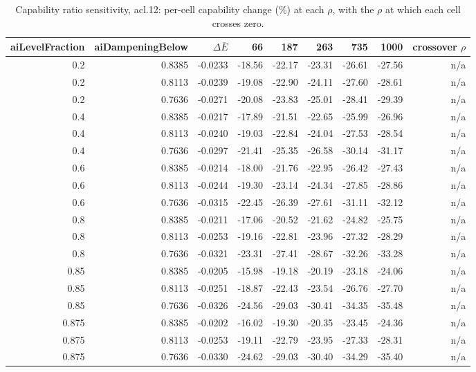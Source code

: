 \begin{table}[htbp]
  \centering
  \caption{Capability ratio sensitivity, acl.12: per-cell capability change (\%) at each $\rho$, with the $\rho$ at which each cell crosses zero.}
  \label{tab:rho-acl-12-cells}
  \begin{tabular}{r r r r r r r r r}
    \toprule
    aiLevelFraction & aiDampeningBelow & $\Delta\overline{E}$ & 66 & 187 & 263 & 735 & 1000 & crossover $\rho$ \\
    \midrule
    0.2 & 0.8385 & -0.0233 & -18.56 & -22.17 & -23.31 & -26.61 & -27.56 & n/a \\
    0.2 & 0.8113 & -0.0239 & -19.08 & -22.90 & -24.11 & -27.60 & -28.61 & n/a \\
    0.2 & 0.7636 & -0.0271 & -20.08 & -23.83 & -25.01 & -28.41 & -29.39 & n/a \\
    0.4 & 0.8385 & -0.0217 & -17.89 & -21.51 & -22.65 & -25.99 & -26.96 & n/a \\
    0.4 & 0.8113 & -0.0240 & -19.03 & -22.84 & -24.04 & -27.53 & -28.54 & n/a \\
    0.4 & 0.7636 & -0.0297 & -21.41 & -25.35 & -26.58 & -30.14 & -31.17 & n/a \\
    0.6 & 0.8385 & -0.0214 & -18.00 & -21.76 & -22.95 & -26.42 & -27.43 & n/a \\
    0.6 & 0.8113 & -0.0244 & -19.30 & -23.14 & -24.34 & -27.85 & -28.86 & n/a \\
    0.6 & 0.7636 & -0.0315 & -22.45 & -26.39 & -27.61 & -31.11 & -32.12 & n/a \\
    0.8 & 0.8385 & -0.0211 & -17.06 & -20.52 & -21.62 & -24.82 & -25.75 & n/a \\
    0.8 & 0.8113 & -0.0253 & -19.16 & -22.81 & -23.96 & -27.32 & -28.29 & n/a \\
    0.8 & 0.7636 & -0.0321 & -23.31 & -27.41 & -28.67 & -32.26 & -33.28 & n/a \\
    0.85 & 0.8385 & -0.0205 & -15.98 & -19.18 & -20.19 & -23.18 & -24.06 & n/a \\
    0.85 & 0.8113 & -0.0251 & -18.87 & -22.43 & -23.54 & -26.76 & -27.70 & n/a \\
    0.85 & 0.7636 & -0.0326 & -24.56 & -29.03 & -30.41 & -34.35 & -35.48 & n/a \\
    0.875 & 0.8385 & -0.0202 & -16.02 & -19.30 & -20.35 & -23.45 & -24.36 & n/a \\
    0.875 & 0.8113 & -0.0253 & -19.11 & -22.79 & -23.95 & -27.33 & -28.31 & n/a \\
    0.875 & 0.7636 & -0.0330 & -24.62 & -29.03 & -30.40 & -34.29 & -35.40 & n/a \\
    \bottomrule
  \end{tabular}
\end{table}

